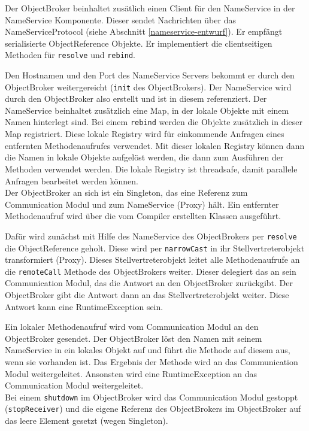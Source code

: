 \documentclass{article}
\begin{document}
Der ObjectBroker beinhaltet zusätlich einen Client für den NameService in der NameService Komponente. Dieser sendet
Nachrichten über das NameServiceProtocol (siehe Abschnitt \ref{nameservice-entwurf}). Er empfängt serialisierte
ObjectReference Objekte. Er implementiert die clientseitigen Methoden für \texttt{resolve} und \texttt{rebind}.

Den Hostnamen und den Port des NameService Servers bekommt er durch den ObjectBroker weitergereicht
(\texttt{init} des ObjectBrokers). Der NameService wird durch den ObjectBroker also erstellt und ist in diesem
referenziert. Der NameService beinhaltet zusätzlich eine Map, in der lokale Objekte mit einem Namen hinterlegt sind.
Bei einem \texttt{rebind} werden die Objekte zusätzlich in dieser Map registriert.
Diese lokale Registry wird für einkommende Anfragen eines entfernten Methodenaufrufes verwendet. Mit dieser lokalen
Registry können dann die Namen in lokale Objekte aufgelöst werden, die dann zum Ausführen der Methoden verwendet werden.
Die lokale Registry ist threadsafe, damit parallele Anfragen bearbeitet werden können.\\

Der ObjectBroker an sich ist ein Singleton, das eine Referenz zum Communication Modul und zum NameService (Proxy) hält.
Ein entfernter Methodenaufruf wird über die vom Compiler erstellten Klassen ausgeführt.

Dafür wird zunächst mit Hilfe des NameService des ObjectBrokers per \texttt{resolve} die ObjectReference geholt. Diese
wird per \texttt{narrowCast} in ihr Stellvertreterobjekt transformiert (Proxy). Dieses Stellvertreterobjekt leitet alle
Methodenaufrufe an die \texttt{remoteCall} Methode des ObjectBrokers weiter. Dieser delegiert das an sein Communication
Modul, das die Antwort an den ObjectBroker zurückgibt. Der ObjectBroker gibt die Antwort dann an das
Stellvertreterobjekt weiter. Diese Antwort kann eine RuntimeException sein.

Ein lokaler Methodenaufruf wird vom Communication Modul an den ObjectBroker gesendet. Der ObjectBroker löst den Namen
mit seinem NameService in ein lokales Objekt auf und führt die Methode auf diesem aus, wenn sie vorhanden ist. Das
Ergebnis der Methode wird an das Communication Modul weitergeleitet. Ansonsten wird eine RuntimeException an das
Communication Modul weitergeleitet.\\

Bei einem \texttt{shutdown} im ObjectBroker wird das Communication Modul gestoppt (\texttt{stopReceiver}) und die
eigene Referenz des ObjectBrokers im ObjectBroker auf das leere Element gesetzt (wegen Singleton).
\end{document}
